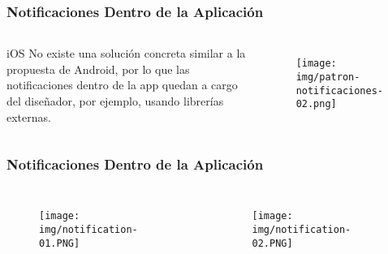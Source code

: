 \documentclass{beamer}
\begin{document}
\begin{frame}
\frametitle{Notificaciones Dentro de la Aplicación}

\begin{columns}[c] %

\begin{block}{iOS}
\justify
No existe una solución concreta similar a la propuesta de Android, por lo que las notificaciones dentro de la app quedan a cargo del diseñador, por ejemplo, usando librerías externas.
\end{block}

\begin{figure}[H]
  \centering
  \texttt{[image: img/patron-notificaciones-02.png]}
\end{figure}
\end{columns}
\end{frame}


\begin{frame}
\frametitle{Notificaciones Dentro de la Aplicación}

\begin{columns}[c] %

\begin{figure}[H]
  \centering
  \texttt{[image: img/notification-01.PNG]}
\end{figure}

\begin{figure}[H]
  \centering
  \texttt{[image: img/notification-02.PNG]}
\end{figure}

\end{columns}
\end{frame}

\end{document}
